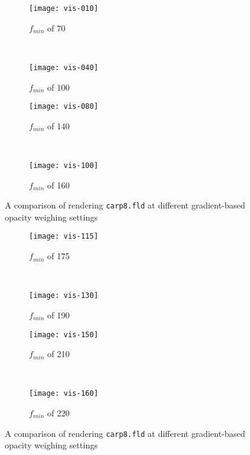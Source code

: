 \begin{figure}[H]
	\centering
	\begin{subfigure}[t]{0.45\textwidth}
		\texttt{[image: vis-010]}
		\caption{$f_{min}$ of 70}
	\end{subfigure}
	~%
	\begin{subfigure}[t]{0.45\textwidth}
		\texttt{[image: vis-040]}
		\caption{$f_{min}$ of 100}
	\end{subfigure}
	
	\begin{subfigure}[t]{0.45\textwidth}
		\texttt{[image: vis-080]}
		\caption{$f_{min}$ of 140}
	\end{subfigure}
	~%
	\begin{subfigure}[t]{0.45\textwidth}
		\texttt{[image: vis-100]}
		\caption{$f_{min}$ of 160}
	\end{subfigure}
	\caption{A comparison of rendering \texttt{carp8.fld} at different gradient-based opacity weighing settings}
	\label{fig:comp:big}
\end{figure}
	
\begin{figure}[H]
	\ContinuedFloat
	\centering
	\begin{subfigure}[t]{0.45\textwidth}
		\texttt{[image: vis-115]}
		\caption{$f_{min}$ of 175}
	\end{subfigure}
	~%
	\begin{subfigure}[t]{0.45\textwidth}
		\texttt{[image: vis-130]}
		\caption{$f_{min}$ of 190}
	\end{subfigure}
	
	\begin{subfigure}[t]{0.45\textwidth}
		\texttt{[image: vis-150]}
		\caption{$f_{min}$ of 210}
	\end{subfigure}
	~%
	\begin{subfigure}[t]{0.45\textwidth}
		\texttt{[image: vis-160]}
		\caption{$f_{min}$ of 220}
	\end{subfigure}
	
	\caption{A comparison of rendering \texttt{carp8.fld} at different gradient-based opacity weighing settings}
	\label{fig:comp:big}
\end{figure}
